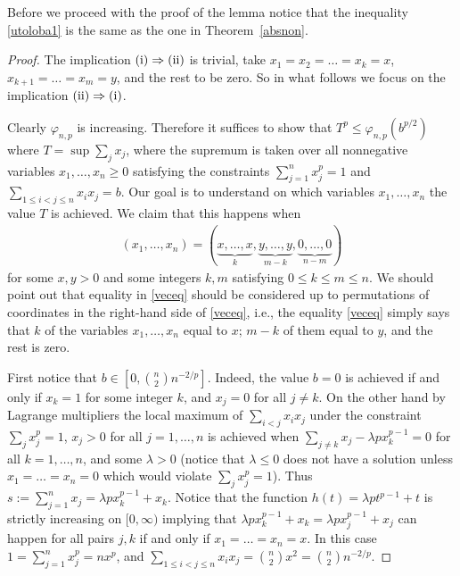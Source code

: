 \documentclass[11pt]{article}
\theoremstyle{definition}
\newcommand{\1}{\mathbf{1}}
\begin{document}
Before we proceed with the proof of the lemma notice that the inequality \eqref{utoloba1} is the same as the one in Theorem~\ref{absnon}. 

    \begin{proof}
The implication $\textup{(i)} \Rightarrow \textup{(ii)}$ is trivial, take $x_{1}=x_{2}=\ldots=x_{k}=x$, $x_{k+1}=\ldots=x_{m}=y$, and the rest to be zero. So in what follows we focus on the implication $\textup{(ii)} \Rightarrow \textup{(i)}$.

       
      Clearly $\varphi_{n,p}$ is increasing.  Therefore it suffices to show that $T^{p}\leq \varphi_{n,p}(b^{p/2})$ where $T = \sup \sum_{j}x_{j}$, where the supremum is taken over all nonnegative variables $x_{1}, \ldots, x_{n}\geq 0$ satisfying the constraints $\sum_{j=1}^{n}x_{j}^{p}=1$ and $\sum_{1\leq i<j\leq n} x_{i}x_{j} =b$. Our goal is to understand on which variables $x_{1}, \ldots, x_{n}$ the value $T$ is achieved. We claim that this happens when
\begin{align}\label{veceq}
(x_{1}, \ldots, x_{n}) = (\underbrace{x,\ldots, x}_{k}, \underbrace{y, \ldots, y}_{m-k}, \underbrace{0, \ldots, 0}_{n-m})
\end{align}
for some $x,y>0$ and some integers $k, m$ satisfying $0\leq k \leq m \leq n$. We should point out that equality in \eqref{veceq} should be considered up to permutations of coordinates in the right-hand side of \eqref{veceq}, i.e., the equality \eqref{veceq} simply says that $k$ of the variables $x_{1}, \ldots, x_{n}$ equal to $x$; $m-k$ of them equal to $y$, and the rest is zero. 

First notice that $b \in [0, \binom{n}{2} n^{-2/p}]$. Indeed, the value $b=0$ is achieved if and only if $x_{k}=1$ for some integer $k$, and $x_{j}=0$ for all $j\neq k$. On the other hand by Lagrange multipliers the local maximum of $\sum_{i<j}x_{i}x_{j}$ under the constraint $\sum_{j} x_{j}^{p}=1$, $x_{j}>0$ for all $j=1, \ldots, n$  is achieved when $\sum_{j\neq k}x_{j} - \lambda px_{k}^{p-1}=0$ for all $k=1, \ldots, n$, and some $\lambda>0$ (notice that $\lambda\leq 0$ does not have a solution unless $x_{1}=\ldots =x_{n}=0$ which  would violate $\sum_{j} x_{j}^{p}=1$). Thus $s:=\sum_{j=1}^{n}x_{j} = \lambda p x_{k}^{p-1}+x_{k}$. Notice that the function $h(t) = \lambda p t^{p-1}+t$ is strictly increasing on $[0, \infty)$ implying that  $\lambda p x_{k}^{p-1}+x_{k} =\lambda px_{j}^{p-1}+x_{j}$ can happen for all pairs $j,k$  if and only if $x_{1}=\ldots = x_{n}=x$. In this case $1=\sum_{j=1}^{n}x_{j}^{p} = nx^{p}$, and $\sum_{1\leq i<j\leq n} x_{i}x_{j} = \binom{n}{2}x^{2} = \binom{n}{2}n^{-2/p}$. 
      

\end{proof}
\end{document}

